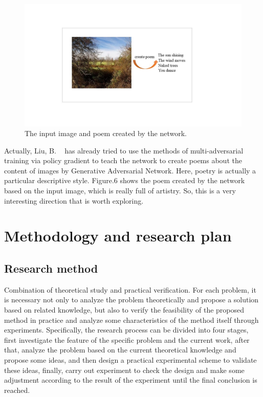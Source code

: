 \documentclass[12pt]{article}
\begin{document}
		\begin{figure}[H]	
		\centering
		\includegraphics[scale = 0.4,trim={6cm 5cm 9cm 5cm},clip]{images/Figure6.jpg}
		\caption{The input image and poem created by the network.}
		\label{fig1}
		\end{figure}
	Actually, Liu, B. ~\cite{liu2018beyond} has already tried to use the methods of multi-adversarial training via policy gradient to teach the network to create poems about the content of images by Generative Adversarial Network. Here, poetry is actually a particular descriptive style. Figure.6 shows the poem created by the network based on the input image, which is really full of artistry. So, this is a very interesting direction that is worth exploring.
	
	\section{Methodology and research plan}
	\subsection{Research method}
	Combination of theoretical study and practical verification. For each problem, it is necessary not only to analyze the problem theoretically and propose a solution based on related knowledge, but also to verify the feasibility of the proposed method in practice and analyze some characteristics of the method itself through experiments. Specifically, the research process can be divided into four stages, first investigate the feature of the specific problem and the current work, after that, analyze the problem based on the current theoretical knowledge and propose some ideas, and then design a practical experimental scheme to validate these ideas, finally, carry out experiment to check the design and make some adjustment according to the result of the experiment until the final conclusion is reached.
	
\end{document}
